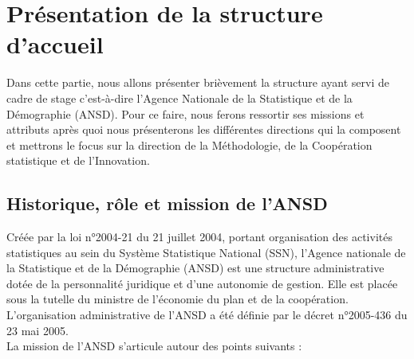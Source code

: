 \chapter{Présentation de la structure d'accueil}

\begin{simplebox2}
Dans cette partie, nous allons présenter brièvement la structure ayant servi de cadre de stage c’est-à-dire l’Agence Nationale de la Statistique et de la Démographie (ANSD). Pour ce faire, nous ferons ressortir ses missions et attributs après quoi nous présenterons les différentes directions qui la composent et mettrons le focus sur la direction de la Méthodologie, de la Coopération statistique et de l'Innovation.
\end{simplebox2}

\section{Historique, rôle et mission de l'ANSD}

Créée par la loi n°2004-21 du 21 juillet 2004, portant organisation des activités statistiques au sein du Système Statistique National (SSN), l’Agence nationale de la Statistique et de la Démographie (ANSD) est une structure administrative dotée de la personnalité juridique et d'une autonomie de gestion. Elle est placée sous la tutelle du ministre de l'économie du plan et de la coopération. L’organisation administrative de l'ANSD a été définie par le décret n°2005-436 du 23 mai 2005.\\

La mission de l’ANSD s’articule autour des points suivants :

